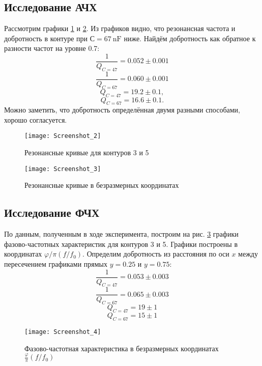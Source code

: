 \documentclass[a4paper]{article}
\begin{document}
\subsection{Исследование АЧХ}
Рассмотрим графики \ref{fig:res} и \ref{fig:resless}. Из графиков видно, что резонансная частота и добротность в контуре при $ С = \SI{67}{\nano \farad} $ ниже. 
Найдём добротность как обратное к разности частот на уровне 0.7:
\begin{equation}
	\frac{1}{Q_{C=47}} = 0.052 \pm 0.001
\end{equation}
\begin{equation}
	\frac{1}{Q_{C=67}} = 0.060 \pm 0.001
\end{equation}
\begin{equation}\label{добр1}
	Q_{C=47} = 19.2 \pm 0.1,
\end{equation}
\begin{equation}\label{добр2}
	Q_{C=67} = 16.6 \pm 0.1.
\end{equation}
Можно заметить, что добротность определённая двумя разными способами, хорошо согласуется.
\begin{figure}[tbp]
	\centering
	\texttt{[image: Screenshot\_2]}
	\caption{Резонансные кривые для контуров 3 и 5}
	\label{fig:res}
\end{figure}
\begin{figure}
	\centering
	\texttt{[image: Screenshot\_3]}
	\caption{Резонансные кривые в безразмерных координатах}
	\label{fig:resless}
\end{figure}

\subsection{Исследование ФЧХ}

По данным, полученным в ходе эксперимента, построим на рис. \ref{fchh} графики фазово-частотных характеристик для контуров 3 и 5. Графики построены в координатах $ \varphi / \pi (f/f_0) $. Определим добротность из расстояния по оси $ x $ между пересечением графиками прямых $ y = 0.25 $ и $ y = 0.75 $:
\begin{equation*}
	\frac{1}{Q_{C=47}} = 0.053 \pm 0.003
\end{equation*}
\begin{equation*}
	\frac{1}{Q_{C=67}} = 0.065 \pm 0.003
\end{equation*}
\begin{equation*}
	Q_{C=47} = 19 \pm 1
\end{equation*}
\begin{equation*}
	Q_{C=67} = 15 \pm 1
\end{equation*}
\begin{figure}[tbp]
	\centering
	\texttt{[image: Screenshot\_4]}
	\caption{Фазово-частотная характеристика в безразмерных координатах $ \frac{\varphi}{\pi} (f / f_0) $}
	\label{fchh}
\end{figure}
\end{document}
